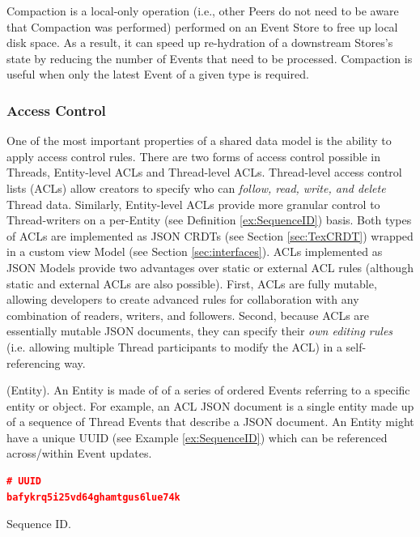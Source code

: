 \documentclass{textile}
\begin{document}
Compaction is a local-only operation (i.e., other Peers do not need to be aware that Compaction was performed) performed on an Event Store to free up local disk space. As a result, it can speed up re-hydration of a downstream Stores's state by reducing the number of Events that need to be processed. Compaction is useful when only the latest Event of a given type is required. 

\subsubsection{Access Control} \label{sec:AccessControl}

One of the most important properties of a shared data model is the ability to apply access control rules. There are two forms of access control possible in Threads, Entity-level ACLs and Thread-level ACLs. Thread-level access control lists (ACLs) allow creators to specify who can \emph{follow, read, write, and delete} Thread data. Similarly, Entity-level ACLs provide more granular control to Thread-writers on a per-Entity (see Definition \ref{ex:SequenceID}) basis. Both types of ACLs are implemented as JSON CRDTs (see Section \ref{sec:TexCRDT}) wrapped in a custom view Model (see Section \ref{sec:interfaces}). ACLs implemented as JSON Models provide two advantages over static or external ACL rules (although static and external ACLs are also possible). First, ACLs are fully mutable, allowing developers to create advanced rules for collaboration with any combination of readers, writers, and followers. Second, because ACLs are essentially mutable JSON documents, they can specify their \emph{own editing rules} (i.e. allowing multiple Thread participants to modify the ACL) in a self-referencing way.

\begin{definition}
(Entity). An Entity is made of of a series of ordered Events referring to a specific entity or object. For example, an ACL JSON document is a single entity made up of a sequence of Thread Events that describe a JSON document. An Entity might have a unique UUID (see Example \ref{ex:SequenceID}) which can be referenced across/within Event updates.
\end{definition}

\begin{example}[!b]
\centering
\begin{lstlisting}[language=json,firstnumber=1]
# UUID
bafykrq5i25vd64ghamtgus6lue74k
\end{lstlisting}
  \caption{Sequence ID.}
  \label{ex:SequenceID}
\end{example}
\end{document}
